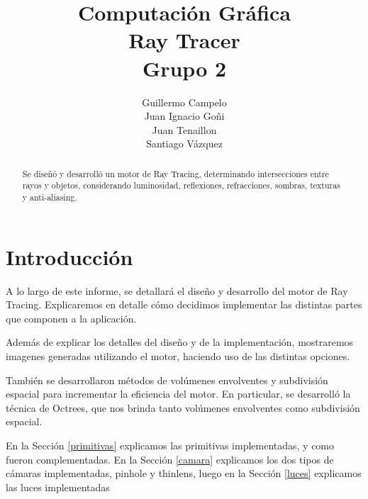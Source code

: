 \documentclass[a4paper,10pt]{article}
\title{Computaci\'on Gr\'afica \\Ray Tracer \\Grupo 2}
\author{Guillermo Campelo\\Juan Ignacio Go\~ni\\Juan Tenaillon\\Santiago V\'azquez}
\begin{document}
\label{introduccion}

\maketitle

\begin{abstract}
Se dise\~n\'o y desarroll\'o un motor de Ray Tracing, determinando intersecciones entre rayos y objetos, considerando luminosidad, reflexiones, refracciones, sombras, texturas y anti-aliasing. 
\end{abstract}

\section{Introducci\'on}

A lo largo de este informe, se detallar\'a el dise\~no y desarrollo del motor de Ray Tracing.  Explicaremos en detalle c\'omo decidimos implementar las distintas partes que componen a la aplicaci\'on.

Adem\'as de explicar los detalles del dise\~no y de la implementaci\'on, mostraremos imagenes generadas utilizando el motor, haciendo uso de las distintas opciones.

Tambi\'en se desarrollaron m\'etodos de vol\'umenes envolventes y subdivisi\'on espacial para incrementar la eficiencia del motor.  En particular, se desarroll\'o la t\'ecnica de Octrees, que nos brinda tanto vol\'umenes envolventes como subdivisi\'on espacial.


En la Secci\'on \ref{primitivas} explicamos las primitivas implementadas, y como fueron complementadas.  En la Secci\'on \ref{camara} explicamos los dos tipos de c\'amaras implementadas, pinhole y thinlens, luego en la Secci\'on \ref{luces} explicamos las luces implementadas
\end{document}
